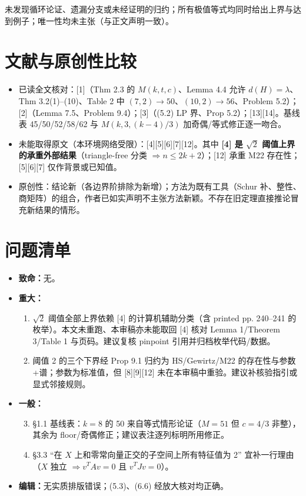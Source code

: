 \documentclass[UTF8,11pt]{ctexart}
\begin{document}
\noindent 未发现循环论证、遗漏分支或未经证明的归约；所有极值等式均同时给出上界与达到例子；唯一性均未主张（与正文声明一致）。

\section{文献与原创性比较}
\begin{itemize}
\item 已读全文核对：[1]（Thm 2.3 的 $M(k,t,c)$、Lemma 4.4 允许 $d(H)=\lambda$、Thm 3.2(1)--(10)、Table 2 中 $(7,2)\to50$、$(10,2)\to56$、Problem 5.2）；[2]（Lemma 7.5、Problem 9.4）；[3]（(5.2) LP 界、Prop 5.2）；[13][14]。基线表 45/50/52/58/62 与 $M(k,3,(k-4)/3)$ 加奇偶/等式修正逐一吻合。
\item 未能取得原文（本环境网络受限）：[4][5][6][7][12]。其中 \textbf{[4] 是 $\sqrt2$ 阈值上界的承重外部结果}（triangle-free 分类 $\Rightarrow n\le2k+2$）；[12] 承重 M22 存在性；[5][6][7] 仅作背景或已知值。
\item 原创性：结论新（各边界阶排除为新增）；方法为既有工具（Schur 补、整性、商矩阵）的组合，作者已如实声明不主张方法新颖。不存在旧定理直接推论冒充新结果的情形。
\end{itemize}

\section{问题清单}
\begin{itemize}
\item \textbf{致命：}无。
\item \textbf{重大：}
\begin{enumerate}
\item $\sqrt2$ 阈值全部上界依赖 [4] 的计算机辅助分类（含 printed pp. 240--241 的枚举）。本文未重跑、本审稿亦未能取回 [4] 核对 Lemma 1/Theorem 3/Table 1 与页码。建议复核 pinpoint 引用并归档枚举代码/数据。
\item 阈值 2 的三个下界经 Prop 9.1 归约为 HS/Gewirtz/M22 的存在性与参数+谱；参数为标准值，但 [8][9][12] 未在本审稿中重验。建议补核验指引或显式邻接规则。
\end{enumerate}
\item \textbf{一般：}
\begin{enumerate}
\setcounter{enumi}{2}
\item \S1.1 基线表：$k=8$ 的 50 来自等式情形论证（$M=51$ 但 $c=4/3$ 非整），其余为 floor/奇偶修正；建议表注逐列标明所用修正。
\item \S3.3 ``在 $X$ 上和零常向量正交的子空间上所有特征值为 2'' 宜补一行理由（$X$ 独立 $\Rightarrow v^TAv=0$ 且 $v^TJv=0$）。
\end{enumerate}
\item \textbf{编辑：}无实质排版错误；(5.3)、(6.6) 经放大核对均正确。
\end{itemize}
\end{document}
